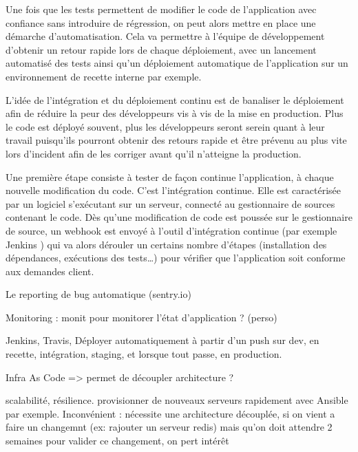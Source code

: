 Une fois que les tests permettent de modifier le code de l'application avec confiance sans introduire de régression, on peut alors mettre en place une démarche d'automatisation. Cela va permettre à l'équipe de développement d'obtenir un retour rapide lors de chaque déploiement, avec un lancement automatisé des tests ainsi qu'un déploiement automatique de l'application sur un environnement de recette interne par exemple.

L'idée de l'intégration et du déploiement continu est de banaliser le déploiement afin de réduire la peur des développeurs vis à vis de la mise en production. Plus le code est déployé souvent, plus les développeurs seront serein quant à leur travail puisqu'ils pourront obtenir des retours rapide et être prévenu au plus vite lors d'incident afin de les corriger avant qu'il n'atteigne la production.

Une première étape consiste à tester de façon continue l'application, à chaque nouvelle modification du code. C'est l'intégration continue. Elle est caractérisée par un logiciel s'exécutant sur un serveur, connecté au gestionnaire de sources contenant le code. Dès qu'une modification de code est poussée sur le gestionnaire de source, un \gls{webhook}  est envoyé à l'outil d'intégration continue (par exemple Jenkins ) qui va alors dérouler un certains nombre d'étapes (installation des dépendances, exécutions des tests\ldots) pour vérifier que l'application soit  conforme aux demandes client.   


Le reporting de bug automatique (sentry.io)

Monitoring : monit pour monitorer l'état d'application ? (perso)

Jenkins, Travis, Déployer automatiquement à partir d'un push sur dev, en recette, intégration, staging, et lorsque tout passe, en production.

Infra As Code => permet de découpler architecture ? %

scalabilité, résilience. provisionner de nouveaux serveurs rapidement avec Ansible par exemple. Inconvénient : nécessite une architecture découplée, si on vient a faire un changemnt (ex: rajouter un serveur redis) mais qu'on doit attendre 2 semaines pour valider ce changement, on pert intérêt

